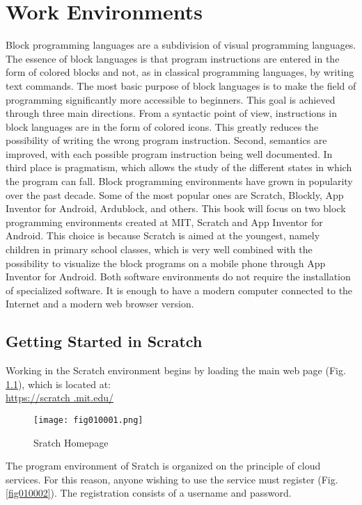 \chapter{Work Environments}

Block programming languages are a subdivision of visual programming languages. The essence of block languages is that program instructions are entered in the form of colored blocks and not, as in classical programming languages, by writing text commands. The most basic purpose of block languages is to make the field of programming significantly more accessible to beginners. This goal is achieved through three main directions. From a syntactic point of view, instructions in block languages are in the form of colored icons. This greatly reduces the possibility of writing the wrong program instruction. Second, semantics are improved, with each possible program instruction being well documented. In third place is pragmatism, which allows the study of the different states in which the program can fall. Block programming environments have grown in popularity over the past decade. Some of the most popular ones are Scratch, Blockly, App Inventor for Android, Ardublock, and others. This book will focus on two block programming environments created at MIT, Scratch and App Inventor for Android. This choice is because Scratch is aimed at the youngest, namely children in primary school classes, which is very well combined with the possibility to visualize the block programs on a mobile phone through App Inventor for Android. Both software environments do not require the installation of specialized software. It is enough to have a modern computer connected to the Internet and a modern web browser version.

\section{Getting Started in Scratch}

Working in the Scratch environment begins by loading the main web page (Fig. \ref{fig010001}), which is located at: \\ \href{https://scratch.mit.edu/}{https://scratch .mit.edu/}

\begin{figure}[H]
   \centering
   \texttt{[image: fig010001.png]}
   \caption{Sratch Homepage}
\label{fig010001}
\end{figure}

The program environment of Sratch is organized on the principle of cloud services. For this reason, anyone wishing to use the service must register (Fig. \ref{fig010002}). The registration consists of a username and password.


